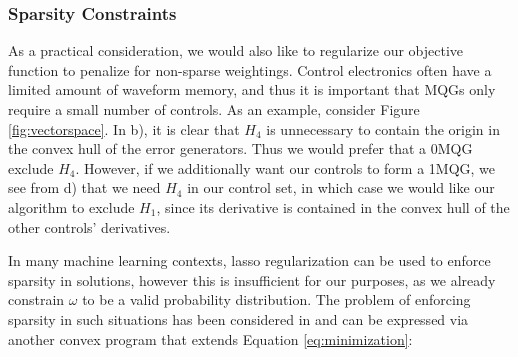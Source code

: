 \documentclass[aps,nofootinbib,pra,notitlepage,twocolumn]{revtex4-1}
\begin{document}

\subsubsection{Sparsity Constraints}

As a practical consideration, we would also like to regularize our objective function to penalize for non-sparse weightings. Control electronics often have a limited amount of waveform memory, and thus it is important that MQGs only require a small number of controls. As an example, consider Figure \ref{fig:vectorspace}. In b), it is clear that $H_4$ is unnecessary to contain the origin in the convex hull of the error generators. Thus we would prefer that a $0$MQG exclude $H_4$. However, if we additionally want our controls to form a 1MQG, we see from d) that we need $H_4$ in our control set, in which case we would like our algorithm to exclude $H_1$, since its derivative is contained in the convex hull of the other controls' derivatives.

In many machine learning contexts, lasso regularization \cite{tibshirani1996regression} can be used to enforce sparsity in solutions, however this is insufficient for our purposes, as we already constrain $\omega$ to be a valid probability distribution. The problem of enforcing sparsity in such situations has been considered in \cite{NIPS2012_4504} and can be expressed via another convex program that extends Equation \ref{eq:minimization}:
\end{document}
